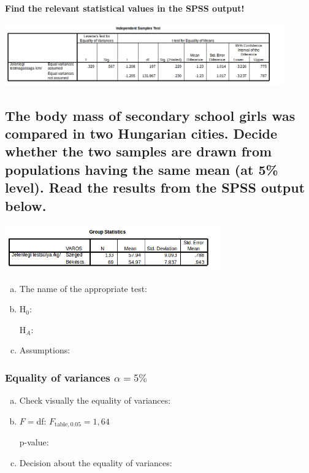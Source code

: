 		\textbf{Find the relevant statistical values in the SPSS output!}
		
			\begin{center}
			\includegraphics[width=0.9\textwidth]{SPSS/Ketmintas1b}
			\end{center}
			
\subsection{The body mass of secondary school girls was compared in two Hungarian cities. Decide whether the two samples are drawn from populations having the same mean (at 5\% level). Read the results from the SPSS output below.}

	\begin{center}
	\includegraphics[width=0.7\textwidth]{SPSS/Ketmintas2a}
	\end{center}
	
	
	\begin{enumerate}[a)]
	\item The name of the appropriate test:	\hrulefill
	\item H$_0$:	\hrulefill

	H$_A$:	\hrulefill
	\item Assumptions:	\hrulefill
	\end{enumerate}
	
\subsubsection*{Equality of variances $\alpha=5\%$}
		\begin{enumerate}[a)]
		\item Check visually the equality of variances:	\hrulefill

			
		\item $F =$\hrulefill \quad df: \hrulefill \quad $F_{\textrm{table}, 0.05} = 1,64$ 
			
					p-value: \hrulefill
		\item Decision about the equality of variances: \hrulefill
		\end{enumerate}
	
